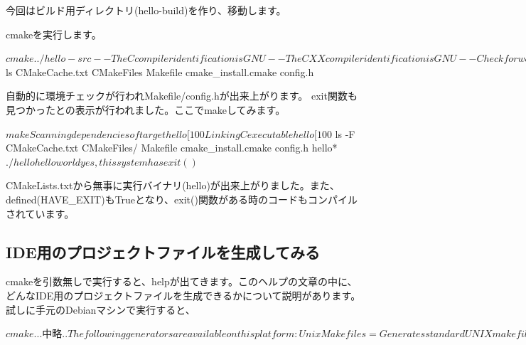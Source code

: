 \documentclass[mingoth,a4paper]{jsarticle}
\begin{document}
今回はビルド用ディレクトリ(hello-build)を作り、移動します。


cmakeを実行します。

\begin{commandline}
$ cmake ../hello-src
-- The C compiler identification is GNU
-- The CXX compiler identification is GNU
-- Check for working C compiler: /usr/bin/gcc
-- Check for working C compiler: /usr/bin/gcc -- works
...中略...
-- Looking for exit
-- Looking for exit - found
-- Configuring done
-- Generating done
-- Build files have been written to: /.../cmake-test/hello-build
$ ls
CMakeCache.txt  CMakeFiles  Makefile  cmake_install.cmake  config.h
\end{commandline}

自動的に環境チェックが行われMakefile/config.hが出来上がります。
exit関数も見つかったとの表示が行われました。ここでmakeしてみます。

\begin{commandline}
$ make
Scanning dependencies of target hello
[100%
Linking C executable hello
[100%
$ ls -F
CMakeCache.txt  CMakeFiles/  Makefile  cmake_install.cmake  config.h  hello*
$ ./hello
hello world
yes, this system has exit()
$
\end{commandline}

CMakeLists.txtから無事に実行バイナリ(hello)が出来上がりました。また、defined(HAVE\_EXIT)もTrueとなり、exit()関数がある時のコードもコンパイルされています。

\subsection{IDE用のプロジェクトファイルを生成してみる}

cmakeを引数無しで実行すると、helpが出てきます。このヘルプの文章の中に、どんなIDE用のプロジェクトファイルを生成できるかについて説明があります。試しに手元のDebianマシンで実行すると、

\begin{commandline}
$ cmake
...中略..
The following generators are available on this platform:
  Unix Makefiles              = Generates standard UNIX makefiles.
  CodeBlocks - Unix Makefiles = Generates CodeBlocks project files.
  Eclipse CDT4 - Unix Makefiles
                              = Generates Eclipse CDT 4.0 project files.
  KDevelop3                   = Generates KDevelop 3 project files.
  KDevelop3 - Unix Makefiles  = Generates KDevelop 3 project files.
$
\end{commandline}
\end{document}
